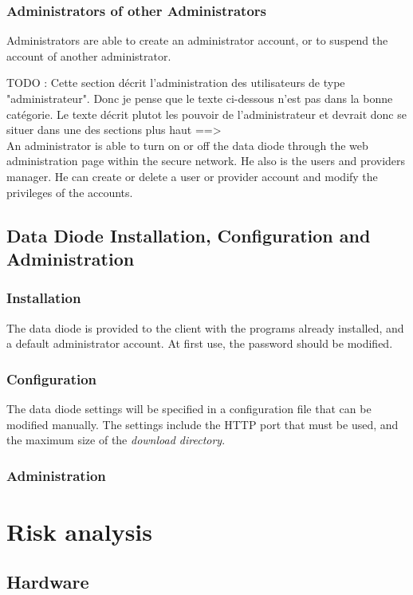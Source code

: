 \documentclass[a4paper,11pt]{article}
\begin{document}
\subsubsection{Administrators of other Administrators}
Administrators are able to create an administrator account, or to suspend the account of another administrator.

TODO : Cette section décrit l'administration des utilisateurs de type "administrateur". Donc je pense que le texte ci-dessous n'est pas dans la bonne catégorie. Le texte décrit plutot les pouvoir de l'administrateur et devrait donc se situer dans une des sections plus haut ==>\\
An administrator is able to turn on or off the data diode through the web administration page within the secure network. He also is the users and providers manager. He can create or delete a user or provider account and modify the privileges of the accounts. 

\subsection{Data Diode Installation, Configuration and Administration}

\subsubsection{Installation}
The data diode is provided to the client with the programs already installed, and a default administrator account. At first use, the password should be modified.

\subsubsection{Configuration}
The data diode settings will be specified in a configuration file that can be modified manually. The settings include the HTTP port that must be used, and the maximum size of the \textit{download directory}.

\subsubsection{Administration}
\section{Risk analysis}
\subsection{Hardware}
\end{document}

